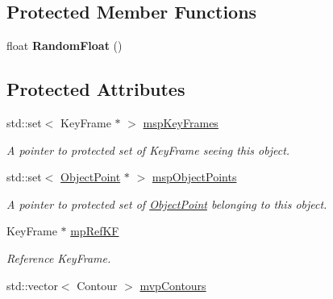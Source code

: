 \subsection*{Protected Member Functions}
\begin{DoxyCompactItemize}
\item 
\mbox{\label{classObject_a6510cecb692aac1ac052cd35c01fb033}} 
float {\bfseries Random\+Float} ()
\end{DoxyCompactItemize}
\subsection*{Protected Attributes}
\begin{DoxyCompactItemize}
\item 
\mbox{\label{classObject_a76ab01f0e8d22cd32a6562a00495c59b}} 
std\+::set$<$ Key\+Frame $\ast$ $>$ \hyperlink{classObject_a76ab01f0e8d22cd32a6562a00495c59b}{msp\+Key\+Frames}
\begin{DoxyCompactList}\small\item\em A pointer to protected set of Key\+Frame seeing this object. \end{DoxyCompactList}\item 
\mbox{\label{classObject_a068c5f6a016148e715eca6c4e05d42c6}} 
std\+::set$<$ \hyperlink{classObjectPoint}{Object\+Point} $\ast$ $>$ \hyperlink{classObject_a068c5f6a016148e715eca6c4e05d42c6}{msp\+Object\+Points}
\begin{DoxyCompactList}\small\item\em A pointer to protected set of \hyperlink{classObjectPoint}{Object\+Point} belonging to this object. \end{DoxyCompactList}\item 
\mbox{\label{classObject_a09d584c9e2f1be37fbffd0983c048d37}} 
Key\+Frame $\ast$ \hyperlink{classObject_a09d584c9e2f1be37fbffd0983c048d37}{mp\+Ref\+KF}
\begin{DoxyCompactList}\small\item\em Reference Key\+Frame. \end{DoxyCompactList}\item 
\mbox{\label{classObject_a066e5319421d737297fc3983741c689f}} 
std\+::vector$<$ Contour $>$ \hyperlink{classObject_a066e5319421d737297fc3983741c689f}{mvp\+Contours}

\end{DoxyCompactItemize}
